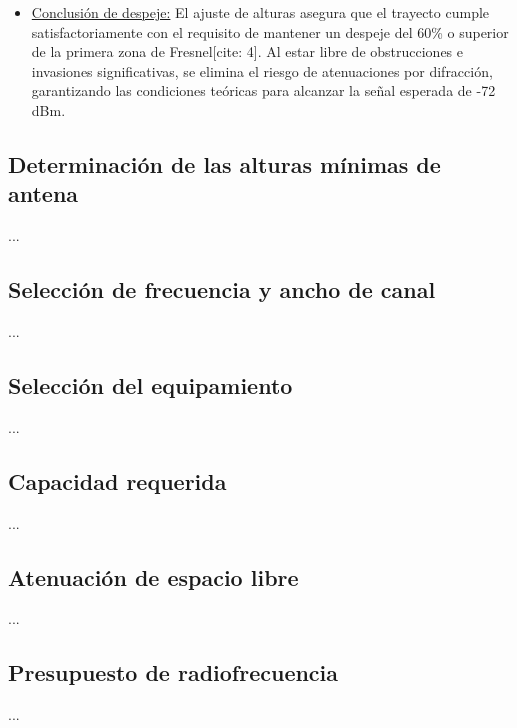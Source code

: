 \begin{itemize}
    El edificio urbano situado a 5.35 km del origen se mantiene como la estructura más cercana a la trayectoria geométrica. No obstante, gracias al incremento en las alturas de los mástiles, la evaluación mediante Google Earth permite estimar que el haz principal transcurre a una distancia lateral y vertical lo suficientemente alejada de la edificación[cite: 4]. 
    
    \item \underline{Conclusión de despeje:} El ajuste de alturas asegura que el trayecto cumple satisfactoriamente con el requisito de mantener un despeje del 60\% o superior de la primera zona de Fresnel[cite: 4]. Al estar libre de obstrucciones e invasiones significativas, se elimina el riesgo de atenuaciones por difracción, garantizando las condiciones teóricas para alcanzar la señal esperada de -72 dBm.
\end{itemize}




\subsection{Determinación de las alturas mínimas de antena}
\label{sec_2.6}
...



\subsection{Selección de frecuencia y ancho de canal}
\label{sec_2.7}
...



\subsection{Selección del equipamiento}
\label{sec_2.8}
...



\subsection{Capacidad requerida}
\label{sec_2.9}
...



\subsection{Atenuación de espacio libre}
\label{sec_2.10}
...



\subsection{Presupuesto de radiofrecuencia}
\label{sec_2.11}
...



